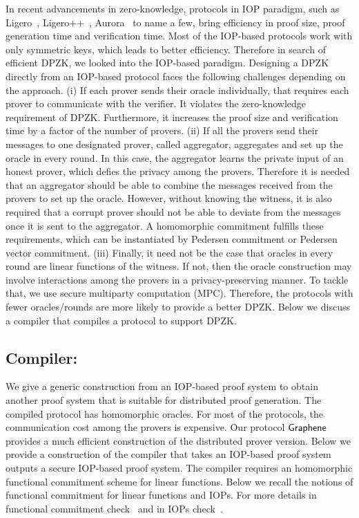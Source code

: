 In recent advancements in zero-knowledge, protocols in IOP paradigm, such as Ligero~\cite{ligero}, Ligero++~\cite{ligero++}, Aurora~\cite{aurora} to name a few, bring efficiency in proof size, proof generation time and verification time. Most of the IOP-based protocols work with only symmetric keys, which leads to better efficiency. Therefore in search of efficient DPZK, we looked into the IOP-based paradigm. Designing a DPZK directly from an IOP-based protocol faces the following challenges depending on the approach. (i) If each prover sends their oracle individually, that requires each prover to communicate with the verifier. It violates the zero-knowledge requirement of DPZK. Furthermore, it increases the proof size and verification time by a factor of the number of provers. (ii) If all the provers send their messages to one designated prover, called aggregator, aggregates and set up the oracle in every round. In this case, the aggregator learns the private input of an honest prover, which defies the privacy among the provers. Therefore it is needed that an aggregator should be able to combine the messages received from the provers to set up the oracle. However, without knowing the witness, it is also required that a corrupt prover should not be able to deviate from the messages once it is sent to the aggregator. A homomorphic commitment fulfills these requirements, which can be instantiated by Pedersen commitment or Pedersen vector commitment. (iii) Finally, it need not be the case that oracles in every round are linear functions of the witness. If not, then the oracle construction may involve interactions among the provers in a privacy-preserving manner. To tackle that, we use secure multiparty computation (MPC). Therefore, the protocols with fewer oracles/rounds are more likely to provide a better DPZK. Below we discuss a compiler that compiles a protocol to support DPZK.  
\subsection{Compiler:}\label{sec:compiler_construction}
We give a generic construction from an IOP-based proof system to obtain another proof system that is suitable for distributed proof generation. The compiled protocol has homomorphic oracles. For most of the protocols, the communication cost among the provers is expensive. Our protocol $\textsf{Graphene}$ provides a much efficient construction of the distributed prover version.
Below we provide a construction of the compiler that takes an IOP-based proof system outputs a secure IOP-based proof system. The compiler requires an homomorphic functional commitment scheme for linear functions. Below we recall the notions of functional commitment for linear functions and IOPs. For more details in functional commitment check~\cite{functionalcom} and in IOPs check~\cite{BCS16}.
